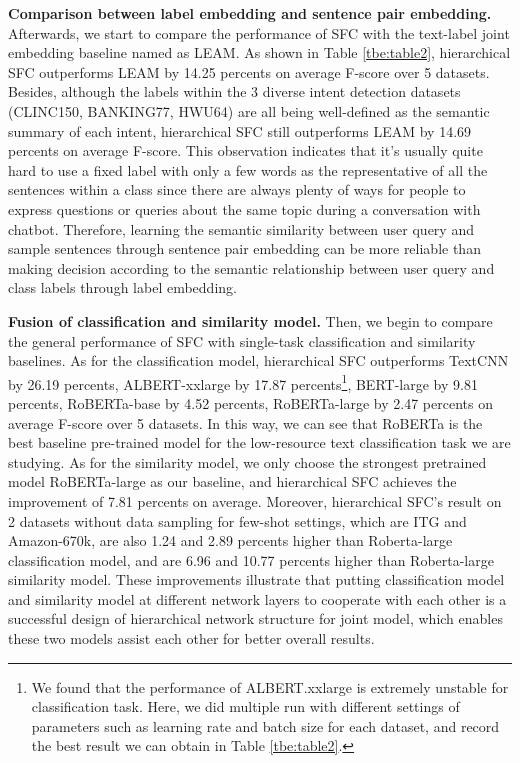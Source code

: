\documentclass[letterpaper]{article} %
\begin{document}
  \textbf{Comparison  between  label  embedding  and  sentence  pair embedding.}
  Afterwards,  we  start  to  compare the performance of SFC with the text-label
  joint  embedding  baseline  named as LEAM. As shown in Table \ref{tbe:table2},
  hierarchical  SFC outperforms LEAM by 14.25 percents on average F-score over 5
  datasets.  Besides,  although the labels within the 3 diverse intent detection
  datasets  (CLINC150,  BANKING77,  HWU64)  are  all  being  well-defined as the
  semantic  summary  of  each intent, hierarchical SFC still outperforms LEAM by
  14.69  percents  on  average  F-score.  This  observation  indicates that it's
  usually  quite  hard  to  use  a  fixed  label  with  only  a few words as the
  representative  of  all  the  sentences  within a class since there are always
  plenty of ways for people to express questions or queries about the same topic
  during   a   conversation  with  chatbot.  Therefore,  learning  the  semantic
  similarity  between  user  query  and  sample  sentences through sentence pair
  embedding  can be more reliable than making decision according to the semantic
  relationship between user query and class labels through label embedding.

  \textbf{Fusion  of  classification  and  similarity  model.} Then, we begin to
  compare  the  general  performance  of SFC with single-task classification and
  similarity  baselines.  As  for  the  classification  model,  hierarchical SFC
  outperforms    TextCNN    by   26.19   percents,   ALBERT-xxlarge   by   17.87
  percents\footnote{We found that the performance of ALBERT.xxlarge is extremely
  unstable  for  classification  task.  Here, we did multiple run with different
  settings  of parameters such as learning rate and batch size for each dataset,
  and  record  the  best  result  we  can  obtain  in  Table \ref{tbe:table2}.},
  BERT-large  by  9.81 percents, RoBERTa-base by 4.52 percents, RoBERTa-large by
  2.47 percents on average F-score over 5 datasets. In this way, we can see that
  RoBERTa  is  the  best  baseline  pre-trained  model for the low-resource text
  classification  task  we  are  studying.  As for the similarity model, we only
  choose  the  strongest  pretrained  model  RoBERTa-large  as our baseline, and
  hierarchical  SFC  achieves  the  improvement  of  7.81  percents  on average.
  Moreover,  hierarchical  SFC's  result on 2 datasets without data sampling for
  few-shot  settings,  which  are  ITG  and  Amazon-670k, are also 1.24 and 2.89
  percents  higher  than  Roberta-large  classification  model, and are 6.96 and
  10.77  percents higher than Roberta-large similarity model. These improvements
  illustrate that putting classification model and similarity model at different
  network  layers  to  cooperate  with  each  other  is  a  successful design of
  hierarchical network structure for joint model, which enables these two models
  assist each other for better overall results.
\end{document}
